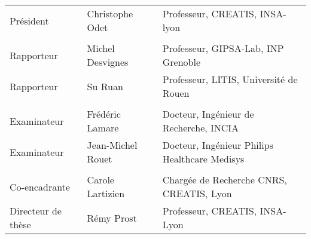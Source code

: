 \begin{titlepage}
\begin{center}
\begin{tabular}{l l l}
Président	& Christophe Odet	&	Professeur, CREATIS, INSA-lyon\\
\\
Rapporteur 	& Michel Desvignes	&	Professeur, GIPSA-Lab, INP Grenoble\\
Rapporteur 	& Su Ruan		&	Professeur, LITIS, Université de Rouen\\
\\
Examinateur	& Frédéric Lamare	&	Docteur, Ingénieur de Recherche, INCIA\\
Examinateur	& Jean-Michel Rouet	&	Docteur, Ingénieur Philips Healthcare Medisys\\
\\
Co-encadrante	& Carole Lartizien	&	Chargée de Recherche CNRS, CREATIS, Lyon\\
Directeur de thèse& Rémy Prost		&	Professeur, CREATIS, INSA-Lyon\\




% 
\end{tabular}



\end{center}

\end{titlepage}